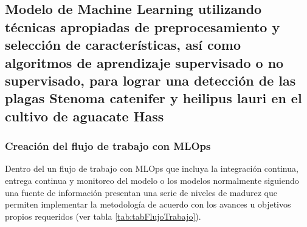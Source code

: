 
\subsection{Modelo de Machine Learning utilizando técnicas apropiadas de preprocesamiento y selección de características, así como algoritmos de aprendizaje supervisado o no supervisado, para lograr una detección de las plagas Stenoma catenifer y heilipus lauri en el cultivo de aguacate Hass}

\subsubsection{Creación del flujo de trabajo con MLOps}

Dentro del un flujo de trabajo con MLOps que incluya la integración continua, entrega continua y monitoreo del modelo o los modelos normalmente siguiendo una fuente de información presentan una serie de niveles de madurez que permiten implementar la metodología de acuerdo con los avances u objetivos propios requeridos (ver tabla \ref{tab:tabFlujoTrabajo}).

